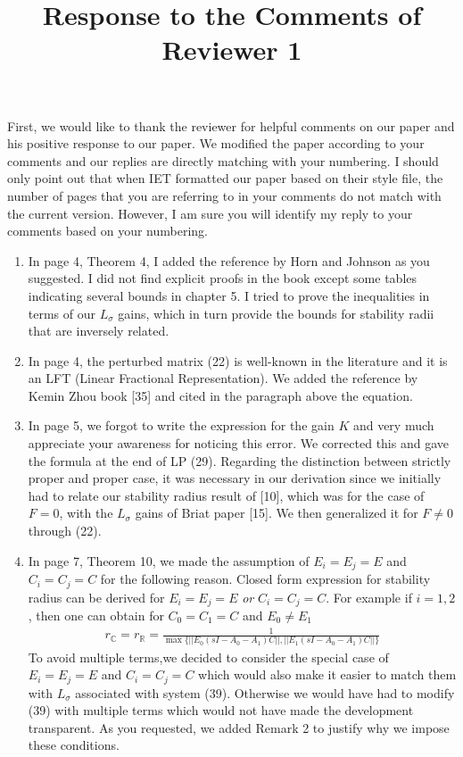 \documentclass[reqno,8pt]{amsart}
\newenvironment{nouppercase}{%
  \let\uppercase\relax%
  \renewcommand{\uppercasenonmath}[1]{}}{}
\begin{document}
\title{Response to the Comments of Reviewer 1}


\begin{nouppercase}
\maketitle
\end{nouppercase}
First, we would like to thank the reviewer for helpful comments on our paper and his positive response to our paper. We modified the paper according to your comments and our replies are directly matching with your numbering. I should only point out that when IET formatted our paper based on their style file, the number of pages that you are referring to in your comments do not match with the current version. However, I am sure you will identify my reply to your comments based on your numbering.

\begin{enumerate}
    \item In page 4, Theorem 4, I added the reference by Horn and Johnson as you suggested. I did not find explicit proofs in the book except some tables indicating several bounds in chapter 5. I tried to prove the inequalities in terms of our $L_{\sigma}$ gains, which in turn provide the bounds for stability radii that are inversely related.
    \item In page 4, the perturbed matrix (22) is well-known in the literature and it is an LFT (Linear Fractional Representation). We added the reference by Kemin Zhou book [35] and cited in the paragraph above the equation.
    \item In page 5, we forgot to write the expression for the gain $K$ and very much appreciate your awareness for noticing this error. We corrected this and gave the formula at the end of LP (29). Regarding the distinction between strictly proper and proper case, it was necessary in our derivation since we initially had to relate our stability radius result of [10], which was for the case of $F=0$, with the $L_{\sigma}$ gains of Briat paper [15]. We then generalized it for $F \neq 0$ through (22). 
    \item In page 7, Theorem 10, we made the assumption of $E_i=E_j=E$ and $C_i=C_j=C$ for the following reason. Closed form expression for stability radius can be derived for $E_i=E_j=E$ \textit{or} $C_i=C_j=C$. For example if $i = 1,2$, then one can obtain for $C_0 = C_1 = C$ and $E_0 \neq E_1$
    \begin{align*}
      \displaystyle  r_{\mathbb{C}} = r_{\mathbb{R}} = \frac{1}{\max \{||E_0(sI-A_0-A_1)C||,||E_1(sI-A_0-A_1)C||\}}
    \end{align*}
    To avoid multiple terms,we decided to consider the special case of $E_i=E_j=E$ and $C_i=C_j=C$ which would also make it easier to match them with $L_{\sigma}$ associated with system (39). Otherwise we would have had to modify (39) with multiple terms which would not have made the development transparent. As you requested, we added Remark 2 to justify why we impose these conditions. 
\end{enumerate}
\end{document}
